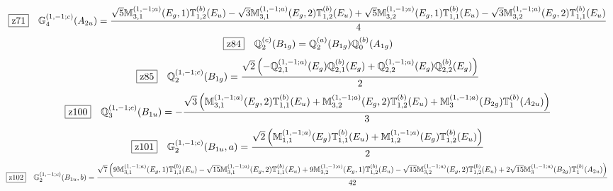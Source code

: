 \documentclass[fleqn,10pt,landscape]{jsarticle}
\begin{document}
\begin{dmath*}
\hspace*{3mm}\fbox{z71}\quad \mathbb{G}_{4}^{(1,-1;c)}(A_{2u})=\frac{\sqrt{5} \mathbb{M}_{3,1}^{(1,-1;a)}(E_{g},1) \mathbb{T}_{1,2}^{(b)}(E_{u}) - \sqrt{3} \mathbb{M}_{3,1}^{(1,-1;a)}(E_{g},2) \mathbb{T}_{1,2}^{(b)}(E_{u}) + \sqrt{5} \mathbb{M}_{3,2}^{(1,-1;a)}(E_{g},1) \mathbb{T}_{1,1}^{(b)}(E_{u}) - \sqrt{3} \mathbb{M}_{3,2}^{(1,-1;a)}(E_{g},2) \mathbb{T}_{1,1}^{(b)}(E_{u})}{4}
\end{dmath*}
\begin{dmath*}
\hspace*{3mm}\fbox{z84}\quad \mathbb{Q}_{2}^{(c)}(B_{1g})=\mathbb{Q}_{2}^{(a)}(B_{1g}) \mathbb{Q}_{0}^{(b)}(A_{1g})
\end{dmath*}
\begin{dmath*}
\hspace*{3mm}\fbox{z85}\quad \mathbb{Q}_{2}^{(1,-1;c)}(B_{1g})=\frac{\sqrt{2} \left(- \mathbb{Q}_{2,1}^{(1,-1;a)}(E_{g}) \mathbb{Q}_{2,1}^{(b)}(E_{g}) + \mathbb{Q}_{2,2}^{(1,-1;a)}(E_{g}) \mathbb{Q}_{2,2}^{(b)}(E_{g})\right)}{2}
\end{dmath*}
\begin{dmath*}
\hspace*{3mm}\fbox{z100}\quad \mathbb{Q}_{3}^{(1,-1;c)}(B_{1u})=- \frac{\sqrt{3} \left(\mathbb{M}_{3,1}^{(1,-1;a)}(E_{g},2) \mathbb{T}_{1,1}^{(b)}(E_{u}) + \mathbb{M}_{3,2}^{(1,-1;a)}(E_{g},2) \mathbb{T}_{1,2}^{(b)}(E_{u}) + \mathbb{M}_{3}^{(1,-1;a)}(B_{2g}) \mathbb{T}_{1}^{(b)}(A_{2u})\right)}{3}
\end{dmath*}
\begin{dmath*}
\hspace*{3mm}\fbox{z101}\quad \mathbb{G}_{2}^{(1,-1;c)}(B_{1u},a)=\frac{\sqrt{2} \left(\mathbb{M}_{1,1}^{(1,-1;a)}(E_{g}) \mathbb{T}_{1,1}^{(b)}(E_{u}) + \mathbb{M}_{1,2}^{(1,-1;a)}(E_{g}) \mathbb{T}_{1,2}^{(b)}(E_{u})\right)}{2}
\end{dmath*}
\begin{dmath*}
\hspace*{3mm}\fbox{z102}\quad \mathbb{G}_{2}^{(1,-1;c)}(B_{1u},b)=\frac{\sqrt{7} \left(9 \mathbb{M}_{3,1}^{(1,-1;a)}(E_{g},1) \mathbb{T}_{1,1}^{(b)}(E_{u}) - \sqrt{15} \mathbb{M}_{3,1}^{(1,-1;a)}(E_{g},2) \mathbb{T}_{1,1}^{(b)}(E_{u}) + 9 \mathbb{M}_{3,2}^{(1,-1;a)}(E_{g},1) \mathbb{T}_{1,2}^{(b)}(E_{u}) - \sqrt{15} \mathbb{M}_{3,2}^{(1,-1;a)}(E_{g},2) \mathbb{T}_{1,2}^{(b)}(E_{u}) + 2 \sqrt{15} \mathbb{M}_{3}^{(1,-1;a)}(B_{2g}) \mathbb{T}_{1}^{(b)}(A_{2u})\right)}{42}
\end{dmath*}
\end{document}
